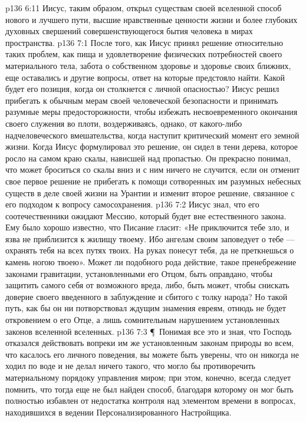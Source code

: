 \vs p136 6:11 Иисус, таким образом, открыл существам своей вселенной способ нового и лучшего пути, высшие нравственные ценности жизни и более глубоких духовных свершений совершенствующегося бытия человека в мирах пространства.
\vs p136 7:1 После того, как Иисус принял решение относительно таких проблем, как пища и удовлетворение физических потребностей своего материального тела, забота о собственном здоровье и здоровье своих ближних, еще оставались и другие вопросы, ответ на которые предстояло найти. Какой будет его позиция, когда он столкнется с личной опасностью? Иисус решил прибегать к обычным мерам своей человеческой безопасности и принимать разумные меры предосторожности, чтобы избежать несвоевременного окончания своего служения во плоти, воздерживаясь, однако, от какого\hyp{}либо надчеловеческого вмешательства, когда наступит критический момент его земной жизни. Когда Иисус формулировал это решение, он сидел в тени дерева, которое росло на самом краю скалы, нависшей над пропастью. Он прекрасно понимал, что может броситься со скалы вниз и с ним ничего не случится, если он отменит свое первое решение не прибегать к помощи сотворенных им разумных небесных существ в деле своей жизни на Урантии и изменит второе решение, связанное с его подходом к вопросу самосохранения.
\vs p136 7:2 Иисус знал, что его соотечественники ожидают Мессию, который будет вне естественного закона. Ему было хорошо известно, что Писание гласит: «Не приключится тебе зло, и язва не приблизится к жилищу твоему. Ибо ангелам своим заповедует о тебе --- охранять тебя на всех путях твоих. На руках понесут тебя, да не преткнешься о камень ногою твоею». Может ли подобного рода действие, такое пренебрежение законами гравитации, установленными его Отцом, быть оправдано, чтобы защитить самого себя от возможного вреда, либо, быть может, чтобы снискать доверие своего введенного в заблуждение и сбитого с толку народа? Но такой путь, как бы он ни потворствовал ждущим знамения евреям, отнюдь не будет откровением о его Отце, а лишь сомнительным нарушением установленных законов вселенной вселенных.
\vs p136 7:3 \P\ Понимая все это и зная, что Господь отказался действовать вопреки им же установленным законам природы во всем, что касалось его личного поведения, вы можете быть уверены, что он никогда не ходил по воде и не делал ничего такого, что могло бы противоречить материальному порядоку управления миром; при этом, конечно, всегда следует помнить, что тогда еще не был найден способ, благодаря которому он мог быть полностью избавлен от недостатка контроля над элементом времени в вопросах, находившихся в ведении Персонализированного Настройщика.
